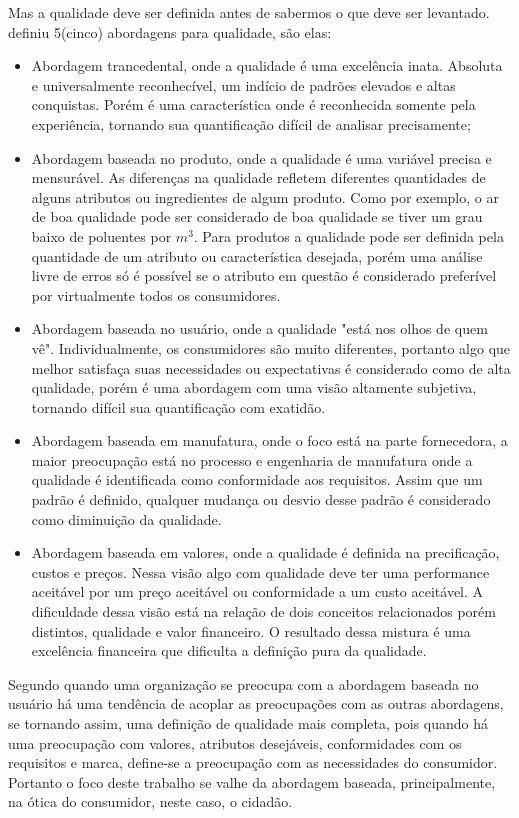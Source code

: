 Mas a qualidade deve ser definida antes de sabermos o que deve ser levantado. \cite{garvin1984} definiu 5(cinco) abordagens para qualidade, são elas:
\begin{itemize}
	\item Abordagem trancedental, onde a qualidade é uma excelência inata. Absoluta e universalmente reconhecível, um indício de padrões elevados e altas conquistas. Porém é uma característica onde é reconhecida somente pela experiência, tornando sua quantificação difícil de analisar precisamente;
	\item Abordagem baseada no produto, onde a qualidade é uma variável precisa e mensurável. As diferenças na qualidade refletem diferentes quantidades de alguns atributos ou ingredientes de algum produto. Como por exemplo, o ar de boa qualidade pode ser considerado de boa qualidade se tiver um grau baixo de poluentes por $m^3$. Para produtos a qualidade pode ser definida pela quantidade de um atributo ou característica desejada, porém uma análise livre de erros só é possível se o atributo em questão é considerado preferível por virtualmente todos os consumidores.
	\item Abordagem baseada no usuário, onde a qualidade "está nos olhos de quem vê". Individualmente, os consumidores são muito diferentes, portanto algo que melhor satisfaça suas necessidades ou expectativas é considerado como de alta qualidade, porém é uma abordagem com uma visão altamente subjetiva, tornando difícil sua quantificação com exatidão.
	\item Abordagem baseada em manufatura, onde o foco está na parte fornecedora, a maior preocupação está no processo e engenharia de manufatura onde a qualidade é identificada como conformidade aos requisitos. Assim que um padrão é definido, qualquer mudança ou desvio desse padrão é considerado como diminuição da qualidade.
	\item Abordagem baseada em valores, onde a qualidade é definida na precificação, custos e preços. Nessa visão algo com qualidade deve ter uma performance aceitável por um preço aceitável ou conformidade a um custo aceitável. A dificuldade dessa visão está na relação de dois conceitos relacionados porém distintos, qualidade e valor financeiro. O resultado dessa mistura é uma excelência financeira que dificulta a definição pura da qualidade.
\end{itemize}

Segundo \cite{paladini1995} quando uma organização se preocupa com a abordagem baseada no usuário há uma tendência de acoplar as preocupações com as outras abordagens, se tornando assim, uma definição de qualidade mais completa, pois quando há uma preocupação com valores, atributos desejáveis, conformidades com os requisitos e marca, define-se a preocupação com as necessidades do consumidor. Portanto o foco deste trabalho se valhe da abordagem baseada, principalmente, na ótica do consumidor, neste caso, o cidadão.

